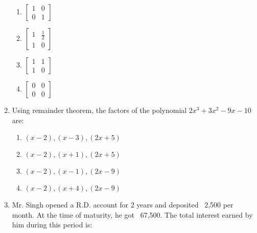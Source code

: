 \begin{enumerate}[label=(\roman*)]
        \begin{multicols}{2}
        \begin{enumerate}[label=(\alph*)]
            \item $\begin{bmatrix*} 1 & 0 \\ 0 & 1 \end{bmatrix*}$ 
            \item $\begin{bmatrix*} 1 & \frac12 \\ 1 & 0 \end{bmatrix*}$ 
            \item $\begin{bmatrix*} 1 & 1 \\ 1 & 0 \end{bmatrix*}$ 
            \item $\begin{bmatrix*} 0 & 0 \\ 0 & 0 \end{bmatrix*}$ 
        \end{enumerate}
        \end{multicols}

    \item Using remainder theorem, the factors of the polynomial
        $2x^3 + 3x^2 - 9x - 10$ are:

        \begin{multicols}{2}
        \begin{enumerate}[label=(\alph*)]
            \item $(x-2),(x-3),(2x+5)$ 
            \item $(x-2),(x+1),(2x+5)$ 
            \item $(x-2),(x-1),(2x-9)$ 
            \item $(x-2),(x+4),(2x-9)$ 
        \end{enumerate}
        \end{multicols}

    \item Mr. Singh opened a R.D. account for 2 years and deposited
        \rupee~2,500 per month. At the time of maturity, he got 
        \rupee~67,500. The total interest earned by him during this
        period is:


\end{enumerate}
